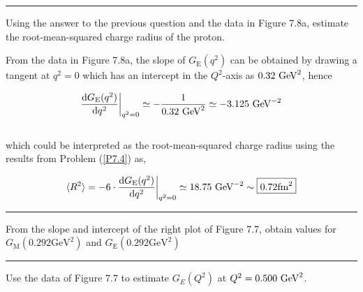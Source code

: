 \noindent\rule{7in}{1.5pt}


\begin{problem}{7.5}
    Using the answer to the previous question and the data in Figure 7.8a, estimate the root-mean-squared charge
    radius of the proton.
\end{problem}
\begin{solution}
From the data in Figure 7.8a, the slope of $G_{\text{E}}(q^2)$ can be obtained by drawing a tangent at $q^2=0$ which has an intercept in the $Q^2$-axis as $0.32 \text{ GeV}^2$, hence

\begin{align*}
    \frac{\mathop{}\!\mathrm{d} G_{\text{E}}(q^2)}{\mathop{}\!\mathrm{d} q^2} \bigg|_{\scriptsize q^2=0} \simeq - \frac{1}{0.32 \text{ GeV}^2} \simeq -3.125 \text{ GeV}^{-2}
\end{align*}\\
which could be interpreted as the root-mean-squared charge radius using the results from Problem (\ref{P7.4}) as,

\begin{align*}
    \langle R^2 \rangle = -6 \cdot \frac{\mathop{}\!\mathrm{d} G_{\text{E}}(q^2)}{\mathop{}\!\mathrm{d} q^2} \bigg|_{\scriptsize q^2=0} \simeq 18.75 \text{ GeV}^{-2} \sim\boxed{ 0.72 \text{fm}^2}
\end{align*}
\end{solution}

\noindent\rule{7in}{1.5pt}


\begin{problem}{7.6}
    From the slope and intercept of the right plot of Figure 7.7, obtain values for $G_{\text{M}}(0.292\text{GeV}^2 )$ and $G_{\text{E}}(0.292\text{GeV}^2)$
\end{problem}
\begin{solution}

\end{solution}

\noindent\rule{7in}{1.5pt}


\begin{problem}{7.7}
    Use the data of Figure 7.7 to estimate $G_E (Q^2 )$ at $Q^2 = 0.500 \text{ GeV}^2 $.
\end{problem}
\begin{solution}

\end{solution}


